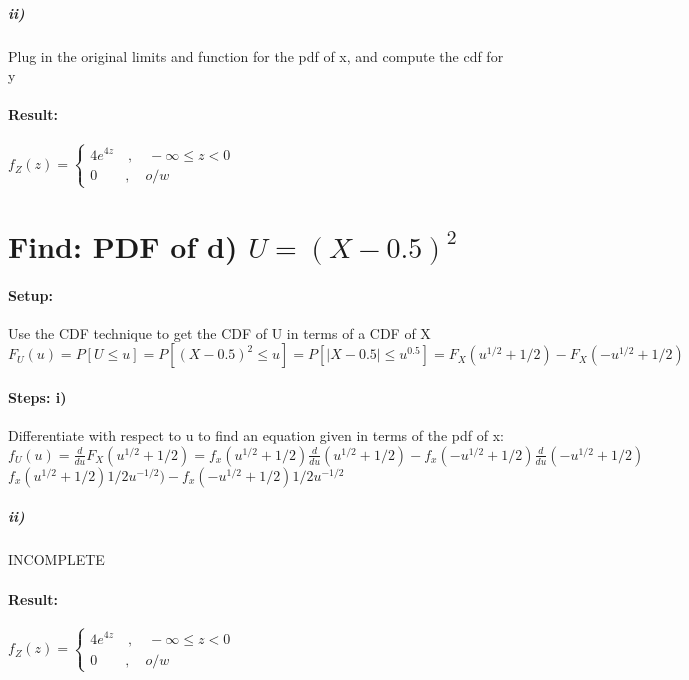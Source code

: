 \subparagraph{ii)} Plug in the original limits and function for the pdf of x, and compute the cdf for y

\paragraph{Result:} ${ f }_{ Z }(z)=\begin{cases} { 4e }^{4z} \quad ,\quad -\infty\le{z}<0 \\ 0\quad  \quad ,\quad o/w \end{cases}$

\section*{Find: PDF of d) $U={ (X-0.5) }^{ 2 }$}

\paragraph{Setup:} Use the CDF technique to get the CDF of U in terms of a CDF of X\\${ F }_{ U }(u)=P[U\le u]=P[{ (X-0.5) }^{ 2 }\le u]=P[ \left| X-0.5 \right| \le { u }^{ 0.5 } ]={ F }_{ X }({u}^{1/2}+1/2)-{ F }_{ X }({-u}^{1/2}+1/2)$

\paragraph{Steps: i)} Differentiate with respect to u to find an equation given in terms of the pdf of x:\\ ${ f }_{ U }(u)=\frac { d }{ du } { F }_{ X }({u}^{1/2}+1/2)={ f }_{ x }({u}^{1/2}+1/2)\frac{ d }{ du }({u}^{1/2}+1/2)-{ f }_{ x }({-u}^{1/2}+1/2)\frac{ d }{ du }({-u}^{1/2}+1/2)$\\${ f }_{ x }({u}^{1/2}+1/2)1/2{u}^{-1/2})-{ f }_{ x }({-u}^{1/2}+1/2)1/2{u}^{-1/2}$ 

\subparagraph{ii)} INCOMPLETE

\paragraph{Result:} ${ f }_{ Z }(z)=\begin{cases} { 4e }^{4z} \quad ,\quad -\infty\le{z}<0 \\ 0\quad  \quad ,\quad o/w \end{cases}$
